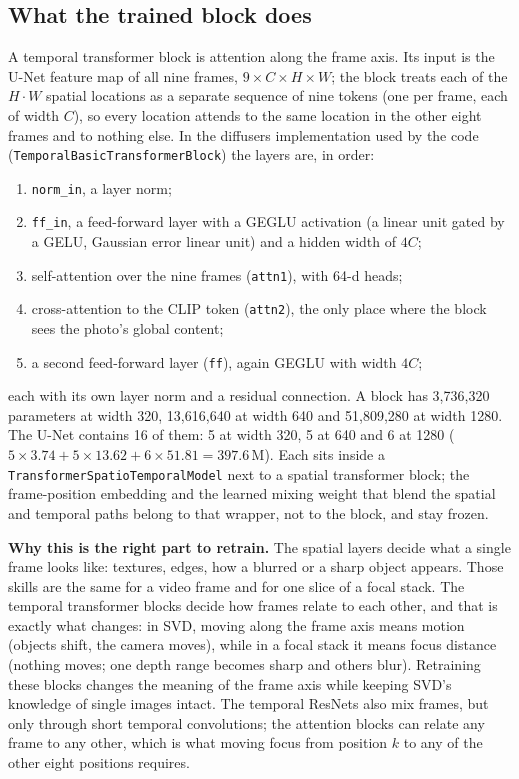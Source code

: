 \documentclass[11pt]{article}
\begin{document}
\subsection{What the trained block does}\label{sec:temporal}
A temporal transformer block is attention along the frame axis. Its input is the U-Net feature map of all nine frames, $9\times C\times H\times W$; the block treats each of the $H\cdot W$ spatial locations as a separate sequence of nine tokens (one per frame, each of width $C$), so every location attends to the same location in the other eight frames and to nothing else.
In the diffusers implementation used by the code (\texttt{TemporalBasicTransformerBlock}) the layers are, in order:
\begin{enumerate}[noitemsep]
  \item \texttt{norm\_in}, a layer norm;
  \item \texttt{ff\_in}, a feed-forward layer with a GEGLU activation (a linear unit gated by a GELU, Gaussian error linear unit) and a hidden width of $4C$;
  \item self-attention over the nine frames (\texttt{attn1}), with 64-d heads;
  \item cross-attention to the CLIP token (\texttt{attn2}), the only place where the block sees the photo's global content;
  \item a second feed-forward layer (\texttt{ff}), again GEGLU with width $4C$;
\end{enumerate}
each with its own layer norm and a residual connection. A block has 3{,}736{,}320 parameters at width 320, 13{,}616{,}640 at width 640 and 51{,}809{,}280 at width 1280. The U-Net contains 16 of them: 5 at width 320, 5 at 640 and 6 at 1280 ($5\times3.74+5\times13.62+6\times51.81=397.6$\,M).
Each sits inside a \texttt{TransformerSpatioTemporalModel} next to a spatial transformer block; the frame-position embedding and the learned mixing weight that blend the spatial and temporal paths belong to that wrapper, not to the block, and stay frozen.

\textbf{Why this is the right part to retrain.} The spatial layers decide what a single frame looks like: textures, edges, how a blurred or a sharp object appears. Those skills are the same for a video frame and for one slice of a focal stack. The temporal transformer blocks decide how frames relate to each other, and that is exactly what changes: in SVD, moving along the frame axis means motion (objects shift, the camera moves), while in a focal stack it means focus distance (nothing moves; one depth range becomes sharp and others blur).
Retraining these blocks changes the meaning of the frame axis while keeping SVD's knowledge of single images intact.
The temporal ResNets also mix frames, but only through short temporal convolutions; the attention blocks can relate any frame to any other, which is what moving focus from position $k$ to any of the other eight positions requires.
\end{document}
